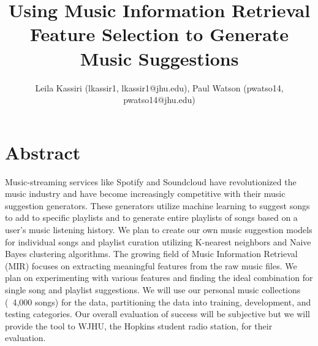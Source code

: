 \documentclass[11pt]{article}
\title{Using Music Information Retrieval Feature Selection to Generate Music Suggestions}
\author{Leila Kassiri (lkassir1, lkassir1@jhu.edu), Paul Watson (pwatso14, pwatso14@jhu.edu)}
\date{}
\begin{document}
\maketitle

\section{Abstract}
Music-streaming services like Spotify and Soundcloud have revolutionized the music industry and have become increasingly competitive with their music suggestion generators. These generators utilize machine learning to suggest songs to add to specific playlists and to generate entire playlists of songs based on a user’s music listening history. We plan to create our own music suggestion models for individual songs and playlist curation utilizing K-nearest neighbors and Naive Bayes clustering algorithms. The growing field of Music Information Retrieval (MIR) focuses on extracting meaningful features from the raw music files. We plan on experimenting with various features and finding the ideal combination for single song and playlist suggestions. We will use our personal music collections (~4,000 songs) for the data, partitioning the data into training, development, and testing categories. Our overall evaluation of success will be subjective but we will provide the tool to WJHU, the Hopkins student radio station, for their evaluation.
\end{document}
